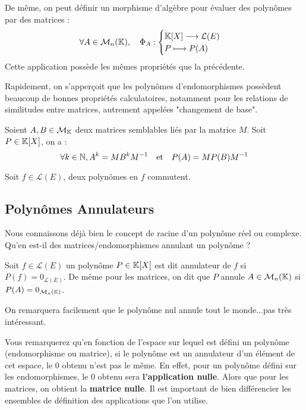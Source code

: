 \begin{remark}
    De même, on peut définir un morphisme d'algèbre pour évaluer des polynômes par des matrices :
        \[ \forall A \in \mathcal{M}_n(\mathbb{K}), \quad \Phi_A : 
            \begin{cases}
                \mathbb{K}[X] \longrightarrow \mathcal{L}(E) \\ 
                P \longmapsto P(A)
            \end{cases}
        \]
    Cette application possède les mêmes propriétés que la précédente. 
\end{remark}

Rapidement, on s'apperçoit que les polynômes d'endomorphismes possèdent beaucoup de bonnes propriétés calculatoires, 
notamment pour les relations de similitudes entre matrices, autrement appelées "changement de base". 

\begin{prop}
    Soient $A,B\in \mathcal{M}_{\mathbb{K}}$ deux matrices semblables liés par la matrice $M$. Soit $P \in \mathbb{K}[X]$, on a :
        $$ \forall k \in \mathbb{N}, A^k = M B^k M ^{-1} \quad \text{et} \quad  P(A) = M P(B) M^{-1} $$
\end{prop}

\begin{prop}[Commutation]
    Soit $f \in \mathcal{L}(E)$, deux polynômes en $f$ commutent. 
\end{prop}


\subsection{Polynômes Annulateurs}

Nous connaissons déjà bien le concept de racine d'un polynôme réel ou complexe. 
Qu'en est-il des matrices/endomorphismes annulant un polynôme ?

\begin{definition}
    Soit $ f \in \mathcal{L}(E)$ un polynôme $ P \in \mathbb{K}[X]$ est dit annulateur de $f$ si $P(f) = 0_{\mathcal{L}(E)}$. 
    De même pour les matrices, on dit que $P$ annule $A \in \mathcal{M}_n(\mathbb{K})$ si $P(A) = 0_{\mathcal{M}_n(\mathbb{K})}$. 
\end{definition}

On remarquera facilement que le polynôme nul annule tout le monde...pas très intéressant. 

\begin{remark}
    Vous remarquerez qu'en fonction de l'espace sur lequel est défini un polynôme (endomorphisme ou matrice), 
    si le polynôme est un annulateur d'un élément de cet espace, le $0$ obtenu n'est pas le même. 
    En effet, pour un polynôme défini sur les endomorphismes, le 0 obtenu sera \textbf{l'application nulle}. 
    Alors que pour les matrices, on obtient la \textbf{matrice nulle}. 
    Il est important de bien différencier les ensembles de définition des applications que l'on utilise. 
\end{remark}



